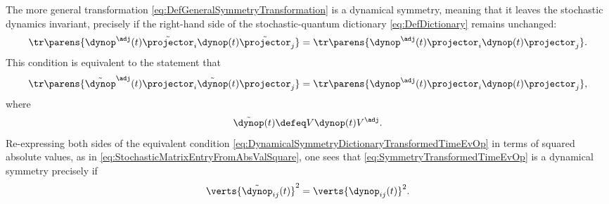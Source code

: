 \documentclass[12pt,english,prl,superscriptaddress,nobibnotes,nofootinbib]{revtex4-2}
\let\originalleft\left
\let\originalright\right
\renewcommand{\left}{\mathopen{}\mathclose\bgroup\originalleft}
\renewcommand{\right}{\aftergroup\egroup\originalright}
\begin{document}
The more general transformation \eqref{eq:DefGeneralSymmetryTransformation}
is a dynamical symmetry, meaning that it leaves the stochastic dynamics
invariant, precisely if the right-hand side of the stochastic-quantum
dictionary \eqref{eq:DefDictionary} remains unchanged: 
\begin{equation}
\tr\parens{\dynop^{\adj}\left(t\right)\tilde{\projector}_{i}\dynop\left(t\right)\tilde{\projector}_{j}}=\tr\parens{\dynop^{\adj}\left(t\right)\projector_{i}\dynop\left(t\right)\projector_{j}}.\label{eq:DynamicalSymmetryDictionaryTransformedProjectors}
\end{equation}
 This condition is equivalent to the statement that 
\begin{equation}
\tr\parens{\tilde{\dynop}^{\adj}\left(t\right)\projector_{i}\tilde{\dynop}\left(t\right)\projector_{j}}=\tr\parens{\dynop^{\adj}\left(t\right)\projector_{i}\dynop\left(t\right)\projector_{j}},\label{eq:DynamicalSymmetryDictionaryTransformedTimeEvOp}
\end{equation}
 where 
\begin{equation}
\tilde{\dynop}\left(t\right)\defeq V\dynop\left(t\right)V^{\adj}.\label{eq:SymmetryTransformedTimeEvOp}
\end{equation}
 Re-expressing both sides of the equivalent condition \eqref{eq:DynamicalSymmetryDictionaryTransformedTimeEvOp}
in terms of squared absolute values, as in \eqref{eq:StochasticMatrixEntryFromAbsValSquare},
one sees that \eqref{eq:SymmetryTransformedTimeEvOp} is a dynamical
symmetry precisely if 
\begin{equation}
\verts{\tilde{\dynop}_{ij}\left(t\right)}^{2}=\verts{\dynop_{ij}\left(t\right)}^{2}.\label{eq:DynamicalSymmetryTransfAbsValSqCondition}
\end{equation}
\end{document}
